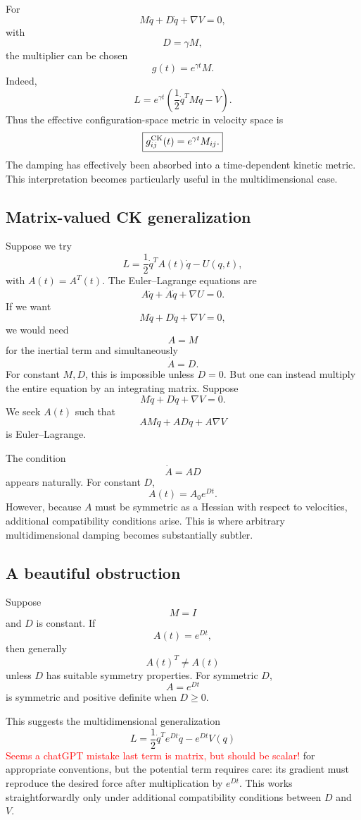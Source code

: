 For $$ M\ddot q+D\dot q+\nabla V=0, $$ with $$ D=\gamma M, $$
the multiplier can be chosen $$ g(t)=e^{\gamma t}M. $$
Indeed,
$$ L= e^{\gamma t} \left( \frac12\dot q^TM\dot q-V \right). $$
Thus the effective configuration-space metric in velocity space is
$$ \boxed{ g_{ij}^{\rm CK}(t)=e^{\gamma t}M_{ij}. } $$
The damping has effectively been absorbed into a time-dependent kinetic metric.
This interpretation becomes particularly useful in the multidimensional case.

\subsection{Matrix-valued CK generalization}

Suppose we try
$$ \boxed{ L= \frac12\dot q^T A(t)\dot q - U(q,t), } $$
with \(A(t)=A^T(t)\).
The Euler–Lagrange equations are
$$ A\ddot q+\dot A\dot q+\nabla U=0. $$
If we want
$$ M\ddot q+D\dot q+\nabla V=0, $$
we would need
$$ A=M $$
for the inertial term and simultaneously
$$ \dot A=D. $$
For constant \(M,D\), this is impossible unless \(D=0\).
But one can instead multiply the entire equation by an integrating matrix.
Suppose $$ M\ddot q+D\dot q+\nabla V=0. $$
We seek \(A(t)\) such that $$ A M\ddot q+A D\dot q+A\nabla V $$
is Euler–Lagrange.

The condition $$ \boxed{ \dot A=AD } $$ appears naturally.
For constant \(D\),$$ A(t)=A_0e^{Dt}. $$
However, because \(A\) must be symmetric as a Hessian with respect to velocities, additional compatibility conditions arise.
This is where arbitrary multidimensional damping becomes substantially subtler.

\subsection{A beautiful obstruction}

Suppose $$ M=I $$ and \(D\) is constant.
If $$ A(t)=e^{Dt}, $$ then generally $$ A(t)^T\neq A(t) $$
unless \(D\) has suitable symmetry properties.
For symmetric \(D\), $$ A=e^{Dt} $$
is symmetric and positive definite when \(D\geq0\).

This suggests the multidimensional generalization
$$ \boxed{ L= \frac12\dot q^T e^{Dt}\dot q - e^{Dt}V(q) } $$
\textcolor{red} {Seems a chatGPT mistake last term is matrix, but
should be scalar!}
for appropriate conventions, but the potential term requires care: its gradient must reproduce the desired force after multiplication by \(e^{Dt}\). This works straightforwardly only under additional compatibility conditions between \(D\) and \(V\).

